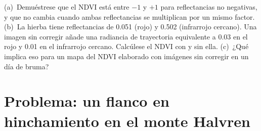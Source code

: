 \begin{exercise}[$\star\star\star$]\label{exo:b3:remote-sensing-gis:12}
(a)~Demuéstrese que el NDVI está entre $-1$ y $+1$ para reflectancias no negativas,
y que no cambia cuando ambas reflectancias se multiplican
por un mismo factor. (b)~La hierba tiene reflectancias de 0.051 (rojo)
y 0.502 (infrarrojo cercano). Una imagen sin corregir añade una radiancia de trayectoria
equivalente a 0.03 en el rojo y 0.01 en el infrarrojo cercano. Calcúlese el
NDVI con y sin ella. (c)~¿Qué implica eso para un mapa del NDVI
elaborado con imágenes sin corregir en un día de bruma?
\end{exercise}

\section{Problema: un flanco en hinchamiento en el monte Halvren}

